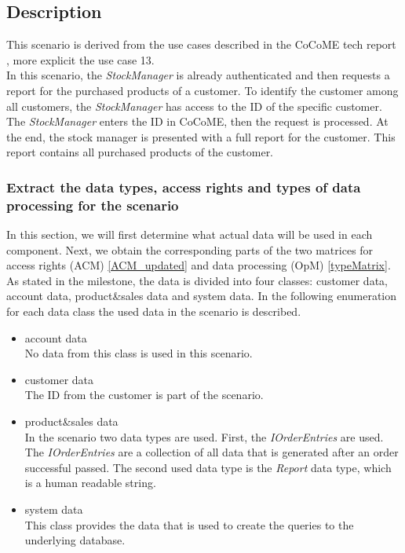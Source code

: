 \subsection{Description}
This scenario is derived from the use cases described in the CoCoME tech report \cite{CoCoMETechReport}, more explicit the use case 13. \\
In this scenario, the \textit{StockManager} is already authenticated and then requests a report for the purchased products of a customer. To identify the customer among all customers, the \textit{StockManager} has access to the ID of the specific customer. The \textit{StockManager} enters the ID in CoCoME, then the request is processed. At the end, the stock manager is presented with a full report for the customer. This report contains all purchased products of the customer.
\subsubsection{Extract the data types, access rights and types of data processing for the scenario} 
\label{accesscontrol_casestudy}
In this section, we will first determine what actual data will be used in each component. Next, we obtain the corresponding parts of the two matrices for access rights (ACM) \autoref{ACM_updated} and data processing (OpM) \autoref{typeMatrix}.\\
As stated in the milestone, the data is divided into four classes: customer data, account data, product\&sales data and system data. In the following enumeration for each data class the used data in the scenario is described.
\begin{itemize}
\item account data \\ No data from this class is used in this scenario.
\item customer data\\ The ID from the customer is part of the scenario.
\item product\&sales data\\ In the scenario two data types are used. First, the \textit{IOrderEntries} are used. The \textit{IOrderEntries} are a collection of all data that is generated after an order successful passed.  The second used data type is the \textit{Report} data type, which is a human readable string. 
\item system data \\ This class provides the data that is used to create the queries to the underlying database.
\end{itemize}

